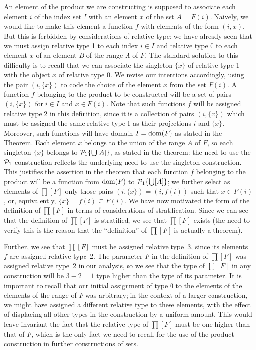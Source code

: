 An element of the product we are constructing is supposed to associate
each element $i$ of the index set $I$ with an element $x$ of the set
$A = F(i)$.  Naively, we would like to make this element a function
$f$ with elements of the form $(i,x)$.  But this is forbidden by
considerations of relative type: we have already seen that we must
assign relative type 1 to each index $i \in I$ and relative type 0 to
each element $x$ of an element $B$ of the range $A$ of $F$.  The
standard solution to this difficulty is to recall that we can
associate the singleton $\{x\}$ of relative type 1 with the object $x$
of relative type 0.  We revise our intentions accordingly, using the
pair $(i,\{x\})$ to code the choice of the element $x$ from the set
$F(i)$.  A function $f$ belonging to the product to be constructed
will be a set of pairs $(i,\{x\})$ for $i \in I$ and $x \in F(i)$.
Note that such functions $f$ will be assigned relative type 2 in this
definition, since it is a collection of pairs $(i,\{x\})$ which must
be assigned the same relative type 1 as their projections $i$ and
$\{x\}$.  Moreover, such functions will have domain $I = \mathop{\mathrm{dom}}(F)$ as
stated in the Theorem.  Each element $x$ belongs to the union of the
range $A$ of $F$, so each singleton $\{x\}$ belongs to ${\cal
P}_1\{\bigcup[A]\}$, as stated in the theorem: the need to use the
${\cal P}_1$ construction reflects the underlying need to use the
singleton construction.  This justifies the assertion in the theorem
that each function $f$ belonging to the product will be a function
from $\mathop{\mathrm{dom}}(F)$ to ${\cal P}_1\{\bigcup[A]\}$; we further select as
elements of $\prod[F]$ only those pairs $(i,\{x\}) = (i,f(i))$ such
that $x \in F(i)$, or, equivalently, $\{x\} = f(i) \subseteq F(i)$.
We have now motivated the form of the definition of $\prod[F]$ in
terms of considerations of stratification.  Since we can see that the
definition of $\prod[F]$ is stratified, we see that $\prod[F]$ exists
(the need to verify this is the reason that the ``definition'' of
$\prod[F]$ is actually a theorem).

Further, we see that $\prod[F]$ must be assigned relative type~3,
since its elements $f$ are assigned relative type~2.  The parameter
$F$ in the definition of $\prod[F]$ was assigned relative type~2 in
our analysis, so we see that the type of $\prod[F]$ in any
construction will be $3-2 = 1$ type higher than the type of its
parameter.  It is important to recall that our initial assignment of
type 0 to the elements of the elements of the range of $F$ was
arbitrary; in the context of a larger construction, we might have
assigned a different relative type to these elements, with the effect
of displacing all other types in the construction by a uniform
amount.  This would leave invariant the fact that the relative type of
$\prod[F]$ must be one higher than that of $F$, which is the only fact
we need to recall for the use of the product construction in further
constructions of sets.


